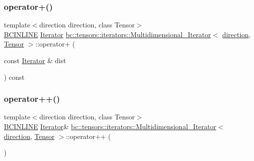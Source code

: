 \subsubsection{\texorpdfstring{operator+()}{operator+()}\hspace{0.1cm}{\footnotesize\ttfamily [2/2]}}
{\footnotesize\ttfamily template$<$direction direction, class Tensor$>$ \\
\hyperlink{common_8h_a6699e8b0449da5c0fafb878e59c1d4b1}{B\+C\+I\+N\+L\+I\+NE} \hyperlink{structbc_1_1tensors_1_1iterators_1_1Multidimensional__Iterator_a12d78eb95b3b0fbee7c824f0a79c1513}{Iterator} \hyperlink{structbc_1_1tensors_1_1iterators_1_1Multidimensional__Iterator}{bc\+::tensors\+::iterators\+::\+Multidimensional\+\_\+\+Iterator}$<$ \hyperlink{namespacebc_1_1tensors_1_1iterators_ae76efe63fb9cb4985d5e4e6af0ebf296}{direction}, \hyperlink{namespacebc_a659391e47ab612be3ba6c18cf9c89159}{Tensor} $>$\+::operator+ (\begin{DoxyParamCaption}\item[{const \hyperlink{structbc_1_1tensors_1_1iterators_1_1Multidimensional__Iterator_a12d78eb95b3b0fbee7c824f0a79c1513}{Iterator} \&}]{dist }\end{DoxyParamCaption}) const\hspace{0.3cm}{\ttfamily [inline]}}

\mbox{\label{structbc_1_1tensors_1_1iterators_1_1Multidimensional__Iterator_a989d6ef27f53f889a8f4c98295c233e8}} 
\subsubsection{\texorpdfstring{operator++()}{operator++()}\hspace{0.1cm}{\footnotesize\ttfamily [1/2]}}
{\footnotesize\ttfamily template$<$direction direction, class Tensor$>$ \\
\hyperlink{common_8h_a6699e8b0449da5c0fafb878e59c1d4b1}{B\+C\+I\+N\+L\+I\+NE} \hyperlink{structbc_1_1tensors_1_1iterators_1_1Multidimensional__Iterator_a12d78eb95b3b0fbee7c824f0a79c1513}{Iterator}\& \hyperlink{structbc_1_1tensors_1_1iterators_1_1Multidimensional__Iterator}{bc\+::tensors\+::iterators\+::\+Multidimensional\+\_\+\+Iterator}$<$ \hyperlink{namespacebc_1_1tensors_1_1iterators_ae76efe63fb9cb4985d5e4e6af0ebf296}{direction}, \hyperlink{namespacebc_a659391e47ab612be3ba6c18cf9c89159}{Tensor} $>$\+::operator++ (\begin{DoxyParamCaption}{ }\end{DoxyParamCaption})\hspace{0.3cm}{\ttfamily [inline]}}

